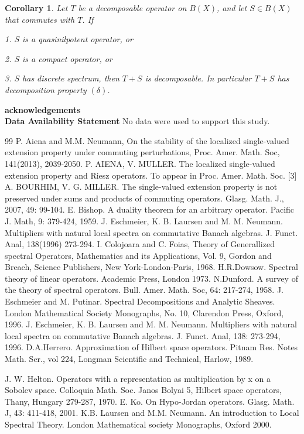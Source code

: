 \documentclass[12pt,a4paper]{amsart}
\newtheorem{corollary}{Corollary}[section]
\begin{document}
\begin{corollary} Let $T$ be a decomposable operator on $B(X)$, and
let $S \in B(X)$ that commutes with $T$. If

 1. $S$ is a quasinilpotent operator, or

 2. $S$ is a compact
operator, or

3. $S$ has discrete spectrum, then $T + S$ is decomposable. In
particular $T + S$ has decomposition property $(\delta)$.
\end{corollary}
\textbf{acknowledgements}\\
 \textbf{Data Availability Statement} No data were used to support this study.
\begin{thebibliography}{99}
 P. Aiena and M.M. Neumann, On the stability of the localized
single-valued extension property under commuting perturbations,
Proc. Amer. Math. Soc, 141(2013), 2039-2050.
 P. AIENA, V. MULLER. The localized single-valued extension property and
Riesz operators. To appear in Proc. Amer. Math. Soc. [3] A.
 BOURHIM, V. G. MILLER. The single-valued extension property is
not preserved under sums and products of commuting operators.
Glasg. Math. J., 2007, 49: 99-104.
 E. Bishop. A duality theorem for an arbitrary operator. Pacific J. Math, 9:
379-424, 1959.  J. Eschmeier, K. B. Laursen and M. M.
Neumann. Multipliers with natural local spectra on commutative
Banach algebras. J. Funct. Anal, 138(1996) 273-294.
 I. Colojoara and C. Foias, Theory of Generallized spectral Operators, Mathematics and its
Applications, Vol. 9, Gordon and Breach, Science Publishers, New
York-London-Paris, 1968.
 H.R.Dowsow. Spectral theory
of linear operators. Academic Press, London 1973.
 N.Dunford. A survey of the theory of spectral operators. Bull. Amer.
Math. Soc, 64: 217-274, 1958.
 J. Eschmeier and M. Putinar. Spectral Decompositions and Analytic Sheaves. London
Mathematical Society Monographs, No. 10, Clarendon Press, Oxford,
1996.
 J. Eschmeier, K. B. Laursen and M. M. Neumann.
Multipliers with natural local spectra on commutative Banach
algebras. J. Funct. Anal, 138: 273-294, 1996.
 D.A.Herrero. Approximation of Hilbert space operators.
Pitnam Res. Notes Math. Ser., vol 224, Longman Scientific and
Technical, Harlow, 1989.

 J. W. Helton. Operators with a representation as
multiplication by x on a Sobolev space. Colloquia Math. Soc. Janos
Bolyai 5, Hilbert space operators, Thany, Hungary 279-287, 1970.
 E. Ko. On Hypo-Jordan operators. Glasg. Math. J, 43: 411-418,
2001.
 K.B. Laursen and M.M. Neumann. An introduction
to Local Spectral Theory. London Mathematical society Monographs,
Oxford 2000.


\end{thebibliography}
\end{document}
